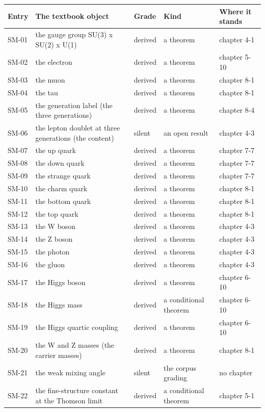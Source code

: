 {\footnotesize\setlength{\LTleft}{0pt}\setlength{\LTright}{0pt}\begin{longtable}{@{}lp{58mm}llp{30mm}@{}}
\hline
Entry & The textbook object & Grade & Kind & Where it stands \\
\hline
\endhead
SM-01 & the gauge group SU(3) x SU(2) x U(1) & derived & a theorem & chapter 4-1 \\
SM-02 & the electron & derived & a theorem & chapter 5-10 \\
SM-03 & the muon & derived & a theorem & chapter 8-1 \\
SM-04 & the tau & derived & a theorem & chapter 8-1 \\
SM-05 & the generation label (the three generations) & derived & a theorem & chapter 8-4 \\
SM-06 & the lepton doublet at three generations (the content) & silent & an open result & chapter 4-3 \\
SM-07 & the up quark & derived & a theorem & chapter 7-7 \\
SM-08 & the down quark & derived & a theorem & chapter 7-7 \\
SM-09 & the strange quark & derived & a theorem & chapter 7-7 \\
SM-10 & the charm quark & derived & a theorem & chapter 8-1 \\
SM-11 & the bottom quark & derived & a theorem & chapter 8-1 \\
SM-12 & the top quark & derived & a theorem & chapter 8-1 \\
SM-13 & the W boson & derived & a theorem & chapter 4-3 \\
SM-14 & the Z boson & derived & a theorem & chapter 4-3 \\
SM-15 & the photon & derived & a theorem & chapter 4-3 \\
SM-16 & the gluon & derived & a theorem & chapter 4-3 \\
SM-17 & the Higgs boson & derived & a theorem & chapter 6-10 \\
SM-18 & the Higgs mass & derived & a conditional theorem & chapter 6-10 \\
SM-19 & the Higgs quartic coupling & derived & a theorem & chapter 6-10 \\
SM-20 & the W and Z masses (the carrier masses) & derived & a theorem & chapter 8-1 \\
SM-21 & the weak mixing angle & silent & the corpus grading & no chapter \\
SM-22 & the fine-structure constant at the Thomson limit & derived & a conditional theorem & chapter 5-1 \\

\end{longtable}}
